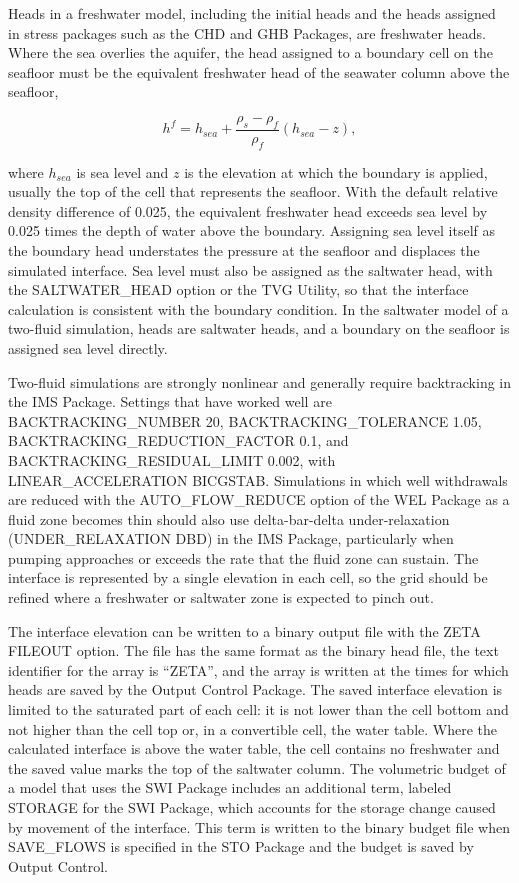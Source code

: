 Heads in a freshwater model, including the initial heads and the heads assigned in stress packages such as the CHD and GHB Packages, are freshwater heads.  Where the sea overlies the aquifer, the head assigned to a boundary cell on the seafloor must be the equivalent freshwater head of the seawater column above the seafloor,

\begin{equation}
h^f = h_{sea} + \frac{\rho_s - \rho_f}{\rho_f} \left( h_{sea} - z \right),
\end{equation}

\noindent where $h_{sea}$ is sea level and $z$ is the elevation at which the boundary is applied, usually the top of the cell that represents the seafloor.  With the default relative density difference of 0.025, the equivalent freshwater head exceeds sea level by 0.025 times the depth of water above the boundary.  Assigning sea level itself as the boundary head understates the pressure at the seafloor and displaces the simulated interface.  Sea level must also be assigned as the saltwater head, with the SALTWATER\_HEAD option or the TVG Utility, so that the interface calculation is consistent with the boundary condition.  In the saltwater model of a two-fluid simulation, heads are saltwater heads, and a boundary on the seafloor is assigned sea level directly.

Two-fluid simulations are strongly nonlinear and generally require backtracking in the IMS Package.  Settings that have worked well are BACKTRACKING\_NUMBER 20, BACKTRACKING\_TOLERANCE 1.05, BACKTRACKING\_REDUCTION\_FACTOR 0.1, and BACKTRACKING\_RESIDUAL\_LIMIT 0.002, with LINEAR\_ACCELERATION BICGSTAB.  Simulations in which well withdrawals are reduced with the AUTO\_FLOW\_REDUCE option of the WEL Package as a fluid zone becomes thin should also use delta-bar-delta under-relaxation (UNDER\_RELAXATION DBD) in the IMS Package, particularly when pumping approaches or exceeds the rate that the fluid zone can sustain.  The interface is represented by a single elevation in each cell, so the grid should be refined where a freshwater or saltwater zone is expected to pinch out.

The interface elevation can be written to a binary output file with the ZETA FILEOUT option.  The file has the same format as the binary head file, the text identifier for the array is ``ZETA'', and the array is written at the times for which heads are saved by the Output Control Package.  The saved interface elevation is limited to the saturated part of each cell: it is not lower than the cell bottom and not higher than the cell top or, in a convertible cell, the water table.  Where the calculated interface is above the water table, the cell contains no freshwater and the saved value marks the top of the saltwater column.  The volumetric budget of a model that uses the SWI Package includes an additional term, labeled STORAGE for the SWI Package, which accounts for the storage change caused by movement of the interface.  This term is written to the binary budget file when SAVE\_FLOWS is specified in the STO Package and the budget is saved by Output Control.

